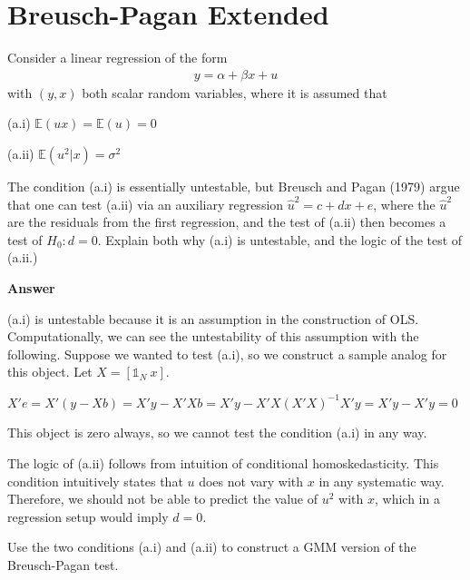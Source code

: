 \documentclass[11pt]{exam}
\begin{document}
    \hypertarget{breusch-pagan-extended}{%
\section{Breusch-Pagan Extended}\label{breusch-pagan-extended}}

Consider a linear regression of the form
\begin{align*}
y = \alpha + \beta x + u
\end{align*}
with \((y, x)\) both scalar random variables, where it is assumed that

(a.i) \(\mathbb{E}(ux) = \mathbb{E}(u) = 0\)

(a.ii) \(\mathbb{E}(u^2|x) = \sigma^2\)

\begin{questions}

    \question The condition (a.i) is essentially untestable, but Breusch
and Pagan (1979) argue that one can test (a.ii) via an auxiliary
regression \(\hat{u}^2 = c + dx + e\), where the \(\hat{u}^2\) are the
residuals from the first regression, and the test of (a.ii) then becomes
a test of \(H_0: d = 0\). Explain both why (a.i) is untestable, and the
logic of the test of (a.ii.)

\textbf{Answer}

(a.i) is untestable because it is an assumption in the construction of
OLS. Computationally, we can see the untestability of this assumption
with the following. Suppose we wanted to test (a.i), so we construct a
sample analog for this object. Let \(X = [\mathbb{1}_N\: x]\).

\(X'e = X'(y-Xb) = X'y - X'Xb = X'y - X'X(X'X)^{-1}X'y = X'y - X'y = 0\)

This object is zero always, so we cannot test the condition (a.i) in any
way.

The logic of (a.ii) follows from intuition of conditional homoskedasticity. This condition intuitively states that \(u\) does not vary with \(x\)
in any systematic way. Therefore, we should not be able to predict the value of \(u^2\) with \(x\), which in a regression setup would imply \(d = 0\).

    \question Use the two conditions (a.i) and (a.ii) to construct a GMM
version of the Breusch-Pagan test.


\end{questions}
\end{document}
